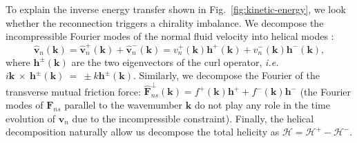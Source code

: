 \documentclass[%
 reprint,
 amsmath,amssymb,
 aps,
 prl,
]{revtex4-2}
\def \k{\mathbf{k}}
\def \h{\mathbf{h}}
\newcommand*{\NOTE}[1]{\textbf{\color{red}[#1]}}
\begin{document}
{To explain the inverse energy transfer shown in Fig.~\ref{fig:kinetic-energy},
we look whether the reconnection triggers a chirality imbalance. 
We decompose the incompressible Fourier modes of the normal fluid velocity 
into helical modes \cite{waleffe-1992}:
\begin{equation}
\hat{\mathbf{v}}_n (\k) = \hat{\mathbf{v}}_n^+(\k) +\hat{\mathbf{v}}_n^-(\k)=
 v_n^+(\mathbf{k}) \mathbf{h}^+(\mathbf{k})+v_n^-(\mathbf{k}) \mathbf{h}^-(\mathbf{k}),
\end{equation}
%
where $\mathbf{h}^\pm (\mathbf{k})$ are the two eigenvectors of the curl 
operator, \textit{i.e.} $i\k~\times~\h^{\pm}(\k)~=~\pm k \h^{\pm}(\k)$. 
Similarly, we decompose the Fourier of the transverse mutual friction force:
$\hat{\mathbf{F}}_{ns}^{\perp}(\k) = f^+(\k) \mathbf{h}^+ + f^-(\k) \mathbf{h}^-$
(the  Fourier modes of $\mathbf{F}_{ns}$ parallel to the wavemumber 
$\k$ do not play any role in the time evolution of $\mathbf{v}_n$ 
due to the incompressible constraint). Finally, the helical decomposition naturally allow us decompose the total helicity as $\mathcal{H}=\mathcal{H}^+-\mathcal{H}^-$.

}
\end{document}

